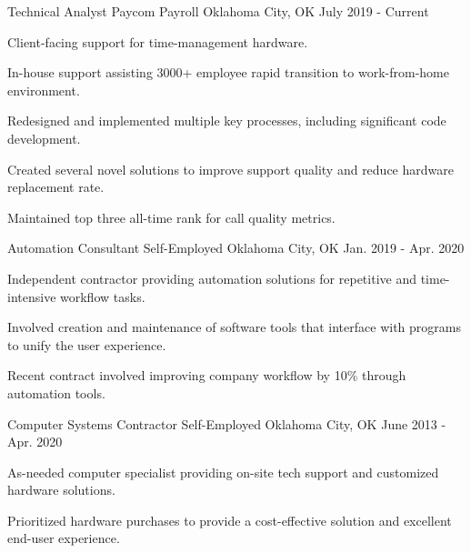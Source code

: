 

\begin{cventries}

\cventry
{Technical Analyst} %
{Paycom Payroll} %
{Oklahoma City, OK} %
{July 2019 - Current} %
{
	\begin{cvitems} %
		\item{Client-facing support for time-management hardware.}
		\item{In-house support assisting 3000+ employee rapid transition to work-from-home environment.}
		\item{Redesigned and implemented multiple key processes, including significant code development.}
		\item{Created several novel solutions to improve support quality and reduce hardware replacement rate.}
		\item{Maintained top three all-time rank for call quality metrics.}
	\end{cvitems}
}

\cventry
{Automation Consultant} %
{Self-Employed} %
{Oklahoma City, OK} %
{Jan. 2019 - Apr. 2020} %
{
	\begin{cvitems} %
		\item{Independent contractor providing automation solutions for repetitive and time-intensive workflow tasks.}
		\item{Involved creation and maintenance of software tools that interface with programs to unify the user experience.}
		\item{Recent contract involved improving company workflow by 10\% through automation tools.}
	\end{cvitems}
}

\cventry
{Computer Systems Contractor} %
{Self-Employed} %
{Oklahoma City, OK} %
{June 2013 - Apr. 2020} %
{
	\begin{cvitems} %
		\item{As-needed computer specialist providing on-site tech support and customized hardware solutions.}
		\item{Prioritized hardware purchases to provide a cost-effective solution and excellent end-user experience.}
	\end{cvitems}
}


\end{cventries}
